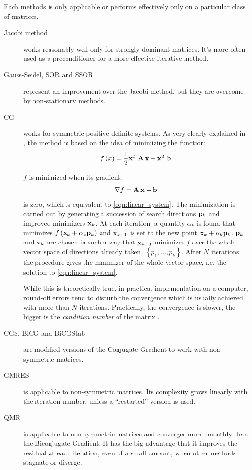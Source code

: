 Each methods is only applicable or performs effectively only on a
particular class of matrices.
\begin{description}
\item[Jacobi method] works reasonably well only for strongly dominant
  matrices. It's more often used as a preconditioner for a more
  effective iterative method.
\item[Gauss-Seidel, SOR and SSOR] represent an improvement over the Jacobi
  method, but they are overcome by non-stationary methods.
\item[CG] works for symmetric positive definite
  systems. As very clearly explained in \cite{shewchuk_cg}, the
  method is based on the idea of minimizing the function:
  \begin{equation*}
    f\left(x\right) = \frac{1}{2}
    {{\mathbf{x}}^T\,{\mathbf{A}\,\mathbf{x}}} - {{\mathbf{x}}^T\,\mathbf{b}}
  \end{equation*}

  $f$ is minimized when its gradient:
  \begin{equation*}
    {\nabla f} = {\mathbf{A}\,\mathbf{x}} - \mathbf{b}
  \end{equation*}
  is zero, which is equivalent to \eqref{eqn:linear_system}. The
  minimization is carried out by generating a succession of search
  directions $\mathbf{p}_k$ and improved minimizers $\mathbf{x}_k$. At
  each iteration, a quantity $\alpha_k$ is found that minimizes
  $f\left(\mathbf{x}_k+\alpha_k \mathbf{p}_k\right)$ and
  $\mathbf{x}_{k+1}$ is set to the new point $\mathbf{x}_k+\alpha_k
  \mathbf{p}_k$. $\mathbf{p}_k$ and $\mathbf{x}_k$ are chosen in
  such a way that $\mathbf{x}_{k+1}$ minimizes $f$ over the whole
  vector space of directions already taken, $\left\{ p_1,\dotsc,p_k
  \right\}$. After $N$ iterations the procedure gives the minimizer of
  the whole vector space, i.e. the solution to
  \eqref{eqn:linear_system}.

  While this is theoretically true, in practical implementation on a computer,
  round-off errors tend to disturb the convergence which is usually
  achieved with more than $N$ iterations. Practically, the convergence
  is slower, the bigger is the \emph{condition number} of the
  matrix \cite{numerical_recipies}.
\item[CGS, BiCG and BiCGStab] are modified versions of the Conjugate
  Gradient to work with non-symmetric matrices.
\item[GMRES] is applicable to non-symmetric
  matrices. Its complexity grows linearly with the iteration number,
  unless a ``restarted'' version is used.
\item[QMR] is applicable to non-symmetric matrices
  and converges more smoothly than the Biconjugate Gradient. It has
  the big advantage that it improves the residual at each iteration,
  even of a small amount, when other methods stagnate or diverge.
\end{description}

